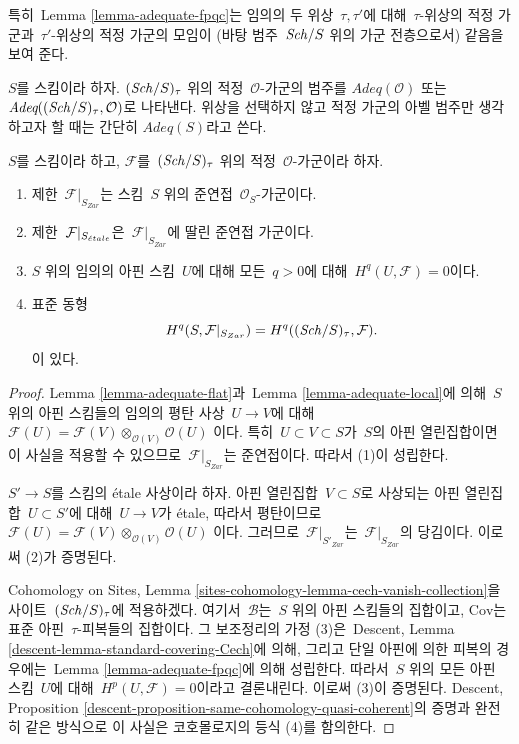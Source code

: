 \noindent
특히\  Lemma \ref{lemma-adequate-fpqc}는 임의의 두 위상\ 
$\tau, \tau'$에 대해\  $\tau$-위상의 적정 가군과\  $\tau'$-위상의
적정 가군의 모임이 (바탕 범주\  $\mathit{Sch}/S$ 위의 가군 전층으로서)
같음을 보여 준다.

\begin{definition}
\label{definition-category-adequate-modules}
$S$를 스킴이라 하자. $(\mathit{Sch}/S)_\tau$ 위의 적정\ 
$\mathcal{O}$-가군의 범주를 {\it $\textit{Adeq}(\mathcal{O})$} 또는
{\it $\textit{Adeq}((\mathit{Sch}/S)_\tau, \mathcal{O})$}로 나타낸다.
위상을 선택하지 않고 적정 가군의 아벨 범주만 생각하고자 할 때는
간단히 {\it $\textit{Adeq}(S)$}라고 쓴다.
\end{definition}

\begin{lemma}
\label{lemma-same-cohomology-adequate}
$S$를 스킴이라 하고, $\mathcal{F}$를\  $(\mathit{Sch}/S)_\tau$ 위의 적정\ 
$\mathcal{O}$-가군이라 하자.
\begin{enumerate}
\item 제한\  $\mathcal{F}|_{S_{Zar}}$는 스킴\  $S$ 위의 준연접\ 
$\mathcal{O}_S$-가군이다.
\item 제한\  $\mathcal{F}|_{S_{\acute{e}tale}}$은\ 
$\mathcal{F}|_{S_{Zar}}$에 딸린 준연접 가군이다.
\item $S$ 위의 임의의 아핀 스킴\  $U$에 대해 모든\  $q > 0$에 대해\ 
$H^q(U, \mathcal{F}) = 0$이다.
\item 표준 동형
$$
H^q(S, \mathcal{F}|_{S_{Zar}}) =
H^q((\mathit{Sch}/S)_\tau, \mathcal{F}).
$$
이 있다.
\end{enumerate}
\end{lemma}

\begin{proof}
Lemma \ref{lemma-adequate-flat}과\ 
Lemma \ref{lemma-adequate-local}에 의해\  $S$ 위의 아핀 스킴들의
임의의 평탄 사상\  $U \to V$에 대해\ 
$\mathcal{F}(U) = \mathcal{F}(V) \otimes_{\mathcal{O}(V)} \mathcal{O}(U)$
이다. 특히\  $U \subset V \subset S$가\  $S$의 아핀 열린집합이면
이 사실을 적용할 수 있으므로\  $\mathcal{F}|_{S_{Zar}}$는 준연접이다.
따라서 (1)이 성립한다.

\medskip\noindent
$S' \to S$를 스킴의 \'etale 사상이라 하자. 아핀 열린집합\ 
$V \subset S$로 사상되는 아핀 열린집합\  $U \subset S'$에
대해\  $U \to V$가 \'etale, 따라서 평탄이므로\ 
$\mathcal{F}(U) = \mathcal{F}(V) \otimes_{\mathcal{O}(V)} \mathcal{O}(U)$
이다. 그러므로\  $\mathcal{F}|_{S'_{Zar}}$는\ 
$\mathcal{F}|_{S_{Zar}}$의 당김이다. 이로써 (2)가 증명된다.

\medskip\noindent
Cohomology on Sites, Lemma
\ref{sites-cohomology-lemma-cech-vanish-collection}을
사이트\  $(\mathit{Sch}/S)_\tau$에 적용하겠다. 여기서\  $\mathcal{B}$는\ 
$S$ 위의 아핀 스킴들의 집합이고, $\text{Cov}$는 표준 아핀\ 
$\tau$-피복들의 집합이다. 그 보조정리의 가정 (3)은\  Descent,
Lemma \ref{descent-lemma-standard-covering-Cech}에 의해, 그리고 단일
아핀에 의한 피복의 경우에는\  Lemma \ref{lemma-adequate-fpqc}에 의해
성립한다. 따라서\  $S$ 위의 모든 아핀 스킴\  $U$에 대해\ 
$H^p(U, \mathcal{F}) = 0$이라고 결론내린다. 이로써 (3)이 증명된다.
Descent, Proposition
\ref{descent-proposition-same-cohomology-quasi-coherent}의 증명과
완전히 같은 방식으로 이 사실은 코호몰로지의 등식 (4)를 함의한다.
\end{proof}

